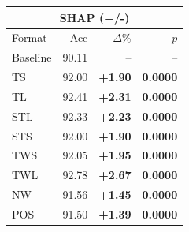 \begin{tabular}{lrrr}
\toprule
\multicolumn{4}{c}{\textbf{SHAP (+/-)}} \\
\midrule
Format & Acc & $\Delta$\% & $p$ \\
\midrule
Baseline & 90.11 & -- & -- \\
\midrule
TS & 92.00 & \textbf{+1.90} & \textbf{0.0000} \\
TL & 92.41 & \textbf{+2.31} & \textbf{0.0000} \\
STL & 92.33 & \textbf{+2.23} & \textbf{0.0000} \\
STS & 92.00 & \textbf{+1.90} & \textbf{0.0000} \\
TWS & 92.05 & \textbf{+1.95} & \textbf{0.0000} \\
TWL & 92.78 & \textbf{+2.67} & \textbf{0.0000} \\
NW & 91.56 & \textbf{+1.45} & \textbf{0.0000} \\
POS & 91.50 & \textbf{+1.39} & \textbf{0.0000} \\
\bottomrule
\end{tabular}